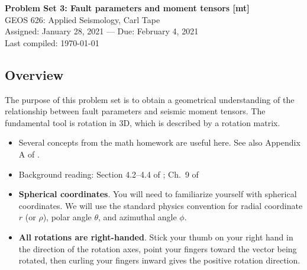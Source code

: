 \documentclass[11pt,titlepage,fleqn]{article}
\begin{document}

\begin{spacing}{1.2}
\centering
{\large \bf Problem Set 3: Fault parameters and moment tensors [mt]} \\
GEOS 626: Applied Seismology, Carl Tape \\
Assigned: January 28, 2021 --- Due: February 4, 2021 \\
Last compiled: \today
\end{spacing}

\begin{spacing}{1.0}

\subsection*{Overview}

The purpose of this problem set is to obtain a geometrical understanding of the relationship between fault parameters and seismic moment tensors. The fundamental tool is rotation in 3D, which is described by a rotation matrix.

\begin{itemize}
\item Several concepts from the math homework are useful here. See also Appendix A of \citet{SteinWysession}.

\item Background reading: Section 4.2--4.4 of \citet{SteinWysession}; Ch.~9 of \citet{ShearerE2}

\item {\bf Spherical coordinates}. You will need to familiarize yourself with spherical coordinates. We will use the standard physics convention for radial coordinate $r$ (or $\rho$), polar angle $\theta$, and azimuthal angle $\phi$.

\item {\bf All rotations are right-handed}. Stick your thumb on your right hand in the direction of the rotation axes, point your fingers toward the vector being rotated, then curling your fingers inward gives the positive rotation direction.


\end{itemize}
\end{spacing}
\end{document}

